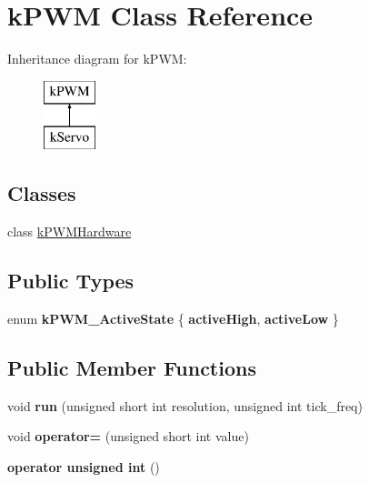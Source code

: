 \hypertarget{classkPWM}{}\section{k\+P\+WM Class Reference}
\label{classkPWM}
Inheritance diagram for k\+P\+WM\+:\begin{figure}[H]
\begin{center}
\leavevmode
\includegraphics[height=2.000000cm]{classkPWM}
\end{center}
\end{figure}
\subsection*{Classes}
\begin{DoxyCompactItemize}
\item 
class \hyperlink{classkPWM_1_1kPWMHardware}{k\+P\+W\+M\+Hardware}
\end{DoxyCompactItemize}
\subsection*{Public Types}
\begin{DoxyCompactItemize}
\item 
enum {\bfseries k\+P\+W\+M\+\_\+\+Active\+State} \{ {\bfseries active\+High}, 
{\bfseries active\+Low}
 \}\hypertarget{classkPWM_a49e0da38cf214e3a0d52d6d511e71c39}{}\label{classkPWM_a49e0da38cf214e3a0d52d6d511e71c39}

\end{DoxyCompactItemize}
\subsection*{Public Member Functions}
\begin{DoxyCompactItemize}
\item 
void {\bfseries run} (unsigned short int resolution, unsigned int tick\+\_\+freq)\hypertarget{classkPWM_a0517e57ef741ed50402fa0bab8ae075e}{}\label{classkPWM_a0517e57ef741ed50402fa0bab8ae075e}

\item 
void {\bfseries operator=} (unsigned short int value)\hypertarget{classkPWM_a8ee0de783dbf27a60e3bed07740b516e}{}\label{classkPWM_a8ee0de783dbf27a60e3bed07740b516e}

\item 
{\bfseries operator unsigned int} ()\hypertarget{classkPWM_ac3114c91e72981e9e29e93d7899f87e5}{}\label{classkPWM_ac3114c91e72981e9e29e93d7899f87e5}

\end{DoxyCompactItemize}
